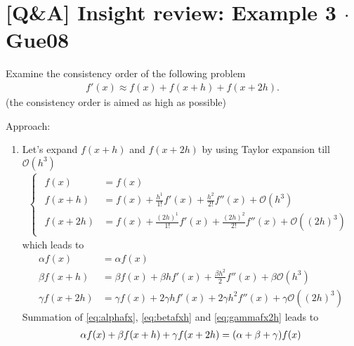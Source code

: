 \documentclass[12pt]{article}
\begin{document}
\section{[Q\&A] Insight review: Example 3 $\cdot$ Gue08}
\begin{example}
	\label{ex:example2consistencyorder}
	Examine the consistency order of the following problem
	\begin{align*}
		f'(x) \approx f(x) + f(x+h) + f(x+2h).
	\end{align*}
	(the consistency order is aimed as high as possible)
\end{example}
Approach: 
\begin{enumerate}
	\item Let's expand $f(x+h)$ and $f(x+2h)$
	      by using Taylor expansion till $\mathcal{O}(h^3)$
	      \begin{align}
		      \label{eq:firstfhreeTaylor}
		      \begin{cases}
			      \begin{aligned}
				      f(x)    & = f(x)                \\
				      f(x+ h) & = f(x) 
				      + \frac{h^1}{1!} f'(x)  
				      + \frac{h^2}{2!} f''(x)  
				      + \mathcal{O}\left( h^3 \right) \\
				      f(x+2h) & = f(x) 
				      + \frac{(2h)^1}{1!} f'(x) 
				      + \frac{(2h)^2}{2!} f''(x) 
				      + \mathcal{O}\left( (2h)^3 \right)
			      \end{aligned}
		      \end{cases}
	      \end{align}
	      which leads to 
	      \begin{align}
		      \alpha f(x)    & = \alpha f(x)  \label{eq:alphafx}                    \\
		      \beta f(x+ h)  & = \beta f(x) 
		      + \beta h f'(x)  
		      + \frac{\beta h^2}{2} f''(x)
		      + \beta \mathcal{O}\left( h^3 \right)              \label{eq:betafxh} \\
		      \gamma f(x+2h) & = \gamma f(x) 
		      + 2\gamma h f'(x)  
		      + 2\gamma h^2 f''(x)
		      + \gamma \mathcal{O}\left( (2h)^3 \right) \label{eq:gammafx2h}
	      \end{align}
	      Summation of \eqref{eq:alphafx}, \eqref{eq:betafxh} and \eqref{eq:gammafx2h} leads to
	      \begin{align}
		      \label{eq:summationall}
		      \alpha f(x) + \beta f(x+h) + \gamma f(x+2h) 
		       & = (\alpha + \beta + \gamma)f(x) \notag                                \\

\end{align}
\end{enumerate}
\end{document}

